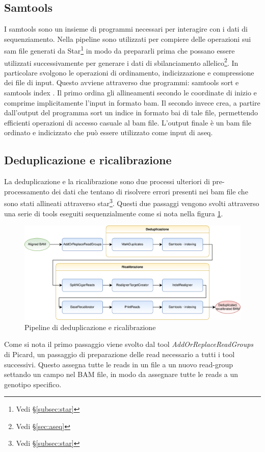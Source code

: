 	\subsection{Samtools}
	I samtools \cite{samtools} sono un insieme di programmi necessari per interagire con i dati di sequenziamento.
	Nella pipeline sono utilizzati per compiere delle operazioni sui sam file generati da Star\footnote{Vedi \S\ref{subsec:star}} in modo da prepararli prima che possano essere utilizzati successivamente per generare i dati di sbilanciamento allelico\footnote{Vedi \S\ref{sec:aseq}}.
  In particolare svolgono le operazioni di ordinamento, indicizzazione e compressione dei file di input.
  Questo avviene attraverso due programmi: samtools sort \cite{samtools-sort} e samtools index \cite{samtools-index}.
  Il primo ordina gli allineamenti secondo le coordinate di inizio e comprime implicitamente l'input in formato bam.
  Il secondo invece crea, a partire dall'output del programma sort un indice in formato bai di tale file, permettendo efficienti operazioni di accesso casuale al bam file.
  L'output finale \`e un bam file ordinato e indicizzato che pu\`o essere utilizzato come input di aseq.

	\subsection{Deduplicazione e ricalibrazione}
	La deduplicazione e la ricalibrazione sono due processi ulteriori di pre-processamento dei dati che tentano di risolvere errori presenti nei bam file che sono stati allineati attraverso star\footnote{Vedi \S\ref{subsec:star}}.
  Questi due passaggi vengono svolti attraverso una serie di tools eseguiti sequenzialmente come si nota nella figura \ref{fig:pipeline_deduprecal}.
  \begin{figure}[H]
    \label{fig:pipeline_deduprecal}
    \centering
    \includegraphics[scale=0.17]{deduprecal.png}
    \caption{Pipeline di deduplicazione e ricalibrazione}
  \end{figure}
  Come si nota il primo passaggio viene svolto dal tool \emph{AddOrReplaceReadGroups} di Picard\cite{picard}, un passaggio di preparazione delle read necessario a tutti i tool successivi.
  Questo assegna tutte le reads in un file a un nuovo read-group settando un campo nel BAM file, in modo da assegnare tutte le reads a un genotipo specifico.


